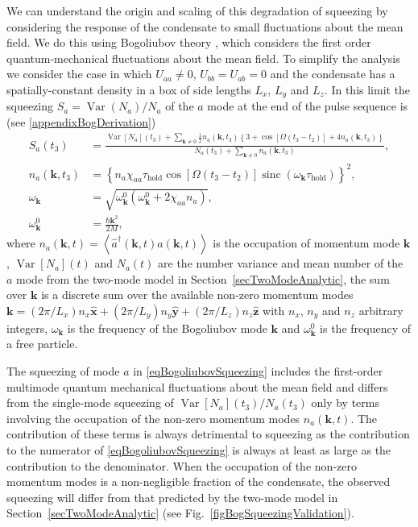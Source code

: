 \documentclass{iopart}
\DeclareMathOperator{\Var}{Var}
\DeclareMathOperator{\sinc}{sinc}
\newcommand{\expect}[1]{\ensuremath{\left<#1\right>}}
\begin{document}
We can understand the origin and scaling of this degradation of squeezing by considering the response of the condensate to small fluctuations about the mean field.  We do this using Bogoliubov theory \cite{PethickSmith}, which considers the first order quantum-mechanical fluctuations about the mean field.  To simplify the analysis we consider the case in which $U_{aa} \neq 0$, $U_{bb}=U_{ab} = 0$ and the condensate has a spatially-constant density in a box of side lengths $L_x$, $L_y$ and $L_z$.  In this limit the squeezing $S_a = \Var(N_a)/N_a$ of the $a$ mode at the end of the pulse sequence is (see \ref{appendixBogDerivation})
\begin{align}
  S_a(t_3) &= \frac{\Var[N_a](t_3) + \sum_{\mathbf{k}\neq 0} \frac{1}{2} n_a(\mathbf{k}, t_3) \left\{3 + \cos\left[\Omega(t_3-t_2)\right] + 4 n_a(\mathbf{k}, t_3)\right\}}{N_a(t_3) + \sum_{\mathbf{k}\neq 0} n_a(\mathbf{k}, t_3)}, \label{eqBogoliubovSqueezing}\\
  n_a(\mathbf{k}, t_3) &= \left\{n_a \chi_{aa} \tau_\text{hold} \cos\left[\Omega\left(t_3-t_2\right)\right] \sinc\left(\omega_\mathbf{k} \tau_\text{hold}\right) \right\}^2,\\
  \omega_\mathbf{k} &= \sqrt{\omega^0_\mathbf{k}(\omega^0_\mathbf{k} + 2 \chi_{aa} n_a)}, \\
  \omega^0_\mathbf{k} &= \frac{\hbar \mathbf{k}^2}{2 M},
\end{align}
where $n_a(\mathbf{k}, t) = \expect{\hat{a}^\dagger(\mathbf{k}, t) \hat{a}(\mathbf{k}, t)}$ is the occupation of momentum mode $\mathbf{k}$, $\Var[N_a](t)$ and $N_a(t)$ are the number variance and mean number of the $a$ mode from the two-mode model in Section~\ref{secTwoModeAnalytic}, the sum over $\mathbf{k}$ is a discrete sum over the available non-zero momentum modes $\mathbf{k} = (2\pi/L_x) n_x \hat{\mathbf{x}} + (2\pi/L_y) n_y \hat{\mathbf{y}} + (2\pi/L_z) n_z \hat{\mathbf{z}}$ with $n_x$, $n_y$ and $n_z$ arbitrary integers, $\omega_\mathbf{k}$ is the frequency of the Bogoliubov mode $\mathbf{k}$ and $\omega^0_\mathbf{k}$ is the frequency of a free particle.

The squeezing of mode $a$ in \eqref{eqBogoliubovSqueezing} includes the first-order multimode quantum mechanical fluctuations about the mean field and differs from the single-mode squeezing of $\Var[N_a](t_3)/N_a(t_3)$ only by terms involving the occupation of the non-zero momentum modes $n_a(\mathbf{k}, t)$.  The contribution of these terms is always detrimental to squeezing as the contribution to the numerator of \eqref{eqBogoliubovSqueezing} is always at least as large as the contribution to the denominator.  When the occupation of the non-zero momentum modes is a non-negligible fraction of the condensate, the observed squeezing will differ from that predicted by the two-mode model in Section~\ref{secTwoModeAnalytic} (see Fig.~\ref{figBogSqueezingValidation}).  
\end{document}
